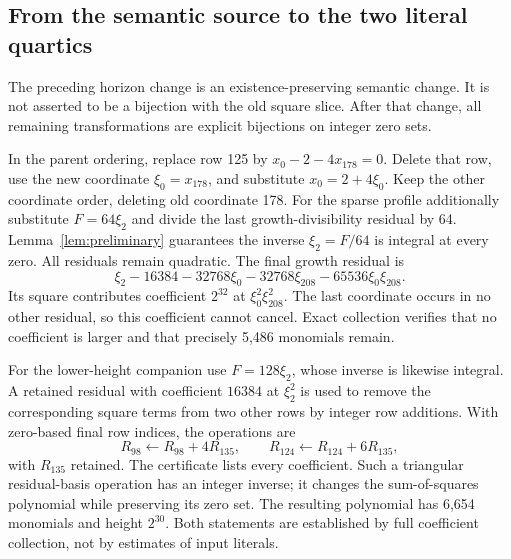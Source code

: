 \subsection{From the semantic source to the two literal quartics}

The preceding horizon change is an existence-preserving semantic change.
It is not asserted to be a bijection with the old square slice.
After that change, all remaining transformations are explicit bijections
on integer zero sets.

In the parent ordering, replace row 125 by \(x_0-2-4x_{178}=0\).
Delete that row, use the new coordinate \(\xi_0=x_{178}\), and substitute
\(x_0=2+4\xi_0\). Keep the other coordinate order, deleting old coordinate
178. For the sparse profile additionally substitute \(F=64\xi_2\) and
divide the last growth-divisibility residual by 64. Lemma~\ref{lem:preliminary}
guarantees the inverse \(\xi_2=F/64\) is integral at every zero.
All residuals remain quadratic. The final growth residual is
\begin{equation}\label{eq:lastgrowth}
 \xi_2-16384-32768\xi_0-32768\xi_{208}
                   -65536\xi_0\xi_{208}.
\end{equation}
Its square contributes coefficient \(2^{32}\) at
\(\xi_0^2\xi_{208}^2\). The last coordinate occurs in no other residual,
so this coefficient cannot cancel. Exact collection verifies that no
coefficient is larger and that precisely 5,486 monomials remain.

For the lower-height companion use \(F=128\xi_2\), whose inverse is
likewise integral. A retained residual with coefficient \(16384\) at
\(\xi_2^2\) is used to remove the corresponding square terms from two
other rows by integer row additions. With zero-based final row indices, the operations are
\[
 R_{98}\leftarrow R_{98}+4R_{135},\qquad
 R_{124}\leftarrow R_{124}+6R_{135},
\]
with \(R_{135}\) retained. The certificate lists every coefficient. Such a triangular residual-basis operation has an integer
inverse; it changes the sum-of-squares polynomial while preserving its
zero set. The resulting polynomial has 6,654 monomials and height
\(2^{30}\). Both statements are established by full coefficient
collection, not by estimates of input literals.
